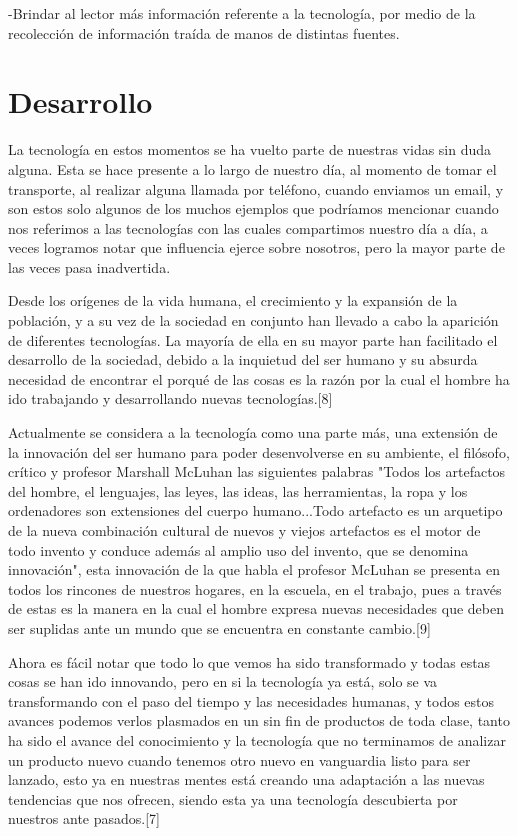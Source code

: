 \documentclass{bmcart}
\begin{document}
-Brindar al lector más información referente a la tecnología, por medio de la recolección de información traída de manos de distintas fuentes.


\section*{Desarrollo}
La tecnología en estos momentos se ha vuelto parte de nuestras vidas sin duda alguna. Esta se hace presente a lo largo de nuestro día, al momento de tomar el transporte, al realizar alguna llamada por teléfono, cuando enviamos un email, y son estos solo algunos de los muchos ejemplos que podríamos mencionar cuando nos referimos a las tecnologías con las cuales compartimos nuestro día a día, a veces logramos notar que influencia ejerce sobre nosotros, pero la mayor parte de las veces pasa inadvertida.\smallskip

Desde los orígenes de la vida humana, el crecimiento y la expansión de la población, y a su vez de la sociedad en conjunto han llevado a cabo la aparición de diferentes tecnologías. La mayoría de ella en  su mayor parte han facilitado el desarrollo de la sociedad, debido a la inquietud del ser humano y su absurda necesidad de encontrar el porqué de las cosas es la razón por la cual el hombre ha ido trabajando y desarrollando nuevas tecnologías.[8]\smallskip

Actualmente se considera a la tecnología como una parte más, una extensión de la innovación del ser humano para poder desenvolverse en su ambiente, el filósofo, crítico y profesor Marshall McLuhan las siguientes palabras "Todos los artefactos del hombre, el lenguajes, las leyes, las ideas, las herramientas, la ropa y los ordenadores son extensiones del cuerpo humano...Todo artefacto es un arquetipo de la nueva combinación cultural de nuevos y viejos artefactos es el motor de todo invento y conduce además al amplio uso del invento, que se denomina innovación", esta innovación de la que habla el profesor McLuhan se presenta en todos los rincones de nuestros hogares, en la escuela, en el trabajo, pues a través de estas es la manera en la cual el hombre expresa nuevas necesidades que deben ser suplidas ante un mundo que se encuentra en constante cambio.[9]\smallskip 

Ahora es fácil notar que todo lo que vemos ha sido transformado y todas estas cosas se han ido innovando, pero en si la tecnología ya está, solo se va transformando con el paso del tiempo y las necesidades humanas, y todos estos avances podemos verlos plasmados en un sin fin de productos de toda clase, tanto ha sido el avance del conocimiento y la tecnología que no terminamos de analizar un producto nuevo cuando tenemos otro nuevo en vanguardia  listo para ser lanzado, esto ya en nuestras mentes está creando una adaptación a las nuevas tendencias que nos ofrecen, siendo esta ya una tecnología descubierta por nuestros ante pasados.[7]\smallskip
\end{document}
